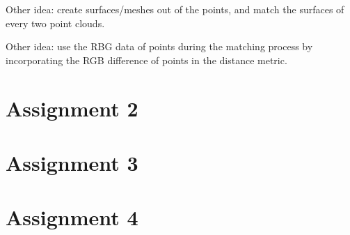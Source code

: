 \documentclass[11pt,english]{article}
\begin{document}
Other idea: create surfaces/meshes out of the points, and match the surfaces of every two point clouds.

Other idea: use the RBG data of points during the matching process by incorporating the RGB difference of points in the distance metric.


\newpage
\section{Assignment 2}


\newpage
\section{Assignment 3}


\newpage
\section{Assignment 4}
\end{document}

